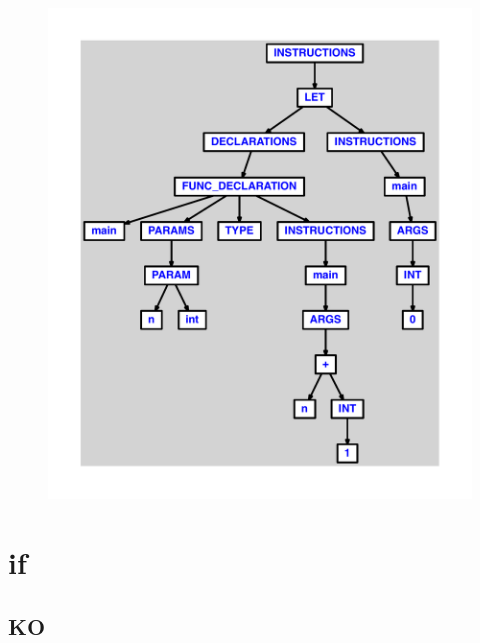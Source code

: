 \documentclass{article}
\begin{document}
\begin{figure}[H]\centering\includegraphics[max width=\textwidth]{ast/ast_238.pdf}\end{figure}\section{if}
\subsection{KO}
\end{document}
